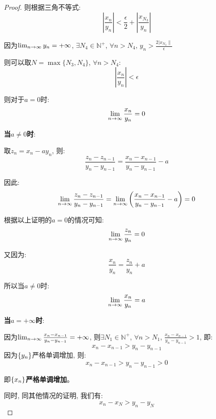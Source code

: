 \begin{proof}
则根据三角不等式:
\begin{equation*}
    \left| \frac{x_n}{y_n} \right| < \frac{\epsilon}{2} + \left|\frac{x_{N_3}}{y_n}\right|
\end{equation*}

因为$\lim_{n \to \infty } y_n = +\infty$, $\exists N_4 \in \mathbb{N}^+$, $\forall n > N_4$, $y_n > \frac{2| x_{N_3}\|}{\epsilon}$

则可以取$N = \max\{N_3, N_4\}$, $\forall n > N_4$:
\begin{equation*}
    \left| \frac{x_n}{y_n} \right| < \epsilon
\end{equation*}

则对于$a = 0$时:
\begin{equation*}
    \lim_{n \to \infty } \frac{x_n}{y_n} = 0
\end{equation*}

{\bf 当$a \neq 0 $时}:

取$z_n = x_n - ay_n$, 则:
\begin{equation*}
    \frac{z_n-z_{n-1}}{y_n-y_{n-1}} = \frac{x_n-x_{n-1}}{y_n-y_{n-1}} - a
\end{equation*}

因此:
\begin{equation*}
    \lim_{n \to \infty } \frac{z_n-z_{n-1}}{y_n-y_{n-1}} = \lim_{n \to \infty } \left(\frac{x_n-x_{n-1}}{y_n-y_{n-1}} - a\right) = 0
\end{equation*}

根据以上证明的$a = 0$的情况可知:
\begin{equation*}
    \lim_{n \to \infty } \frac{z_n}{y_n} = 0
\end{equation*}

又因为:
\begin{equation*}
    \frac{x_n}{y_n} = \frac{z_n}{y_n} + a
\end{equation*}

所以当$a \neq 0$时:
\begin{equation*}
    \lim_{n \to \infty } \frac{x_n}{y_n} = a
\end{equation*}

{\bf 当$a = +\infty$时}:

因为$\lim_{n \to \infty } \frac{x_n-x_{n-1}}{y_n-y_{n-1}} = +\infty$, 则$\exists N_1 \in \mathbb{N}^+$, $\forall n > N_1$, $\frac{x_n-x_{n-1}}{y_n-y_{n-1}} > 1$, 即:
\[ x_n - x_{n-1} > y_n - y_{n-1} \]
因为$\left\{ y_n\right\}$严格单调增加, 则:
\[ x_n - x_{n-1} > y_n - y_{n-1}> 0 \]


即$\left\{ x_n\right\}${\bf 严格单调增加}。

同时, 同其他情况的证明, 我们有:
\[ x_n - x_N > y_n - y_N\]


\end{proof}
